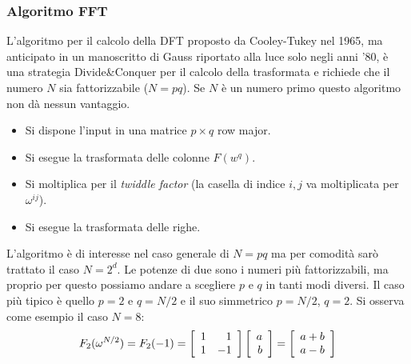 \documentclass[a4paper,portrait,12pt]{article}
\theoremstyle{definition}
\begin{document}
\subsubsection{Algoritmo FFT}

L’algoritmo per il calcolo della DFT proposto da Cooley-Tukey nel 1965, ma anticipato in un manoscritto di Gauss riportato alla luce solo negli anni ’80, è una strategia Divide\&Conquer per il calcolo della trasformata e richiede che il numero $N$ sia fattorizzabile ($N = pq$).
Se $N$ è un numero primo questo algoritmo non dà nessun vantaggio.
\begin{itemize}
\item Si dispone l’input in una matrice $p \times q$ row major.
\item Si esegue la trasformata delle colonne $F(w^q)$.
\item Si moltiplica per il \textit{twiddle factor} (la casella di indice $i,j$ va moltiplicata per $\omega^{ij}$).
\item Si esegue la trasformata delle righe.
\end{itemize}

L’algoritmo è di interesse nel caso generale di $N = pq$ ma per comodità sarò trattato il caso $N = 2^d$.
Le potenze di due sono i numeri più fattorizzabili, ma proprio per questo possiamo andare a scegliere $p$ e $q$ in tanti modi diversi.
Il caso più tipico è quello $p = 2$ e $q = N/2$ e il suo simmetrico $p = N/2$, $q = 2$.
Si osserva come esempio il caso $N = 8$:\\

\begin{gather*}
F_2(\omega^{N/2}) = F_2(-1) = 
\left[\begin{array}{r r}1 & 1\\1 & -1\end{array}\right]
\left[\begin{array}{r}a\\b\end{array}\right]
=
\left[\begin{array}{r}a+b\\a-b\end{array}\right]
\end{gather*}
\end{document}
